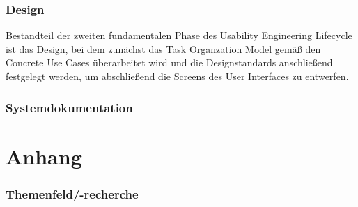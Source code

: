 \documentclass[a4paper,11pt]{article}%
\renewcommand{\\}{\vspace*{0.5\baselineskip} \newline}
\begin{document}
	\tableofcontents
	\newpage
	
	\listoftables{}
	\newpage
	
	\listoffigures{}
	\newpage
	
	
	\newpage
	
	
	\newpage
	
	
	\newpage
	
	
	\newpage
	
	
	\newpage
	
	
	\newpage
	
	
	\newpage
	
	\section{Design}
	Bestandteil der zweiten fundamentalen Phase des Usability Engineering Lifecycle ist das Design, bei dem zunächst das Task Organzation Model gemäß den Concrete Use Cases überarbeitet wird und die Designstandards anschließend festgelegt werden, um abschließend die Screens des User Interfaces zu entwerfen. 
	
	\newpage
	
	\section{Systemdokumentation}
	
	\newpage
	
	
	\newpage
	
	
	\newpage
	
	\appendix
	\vspace*{\fill}
	\part*{Anhang}
	\setcounter{section}{0}%
	\setcounter{subsection}{0}%
	\setcounter{figure}{0}
	\renewcommand{\thesection}{\Alph{section}}
	\renewcommand\thefigure{\Alph{section}\arabic{figure}}
	\vfill
	\newpage
	
	\newpage
	
	
	\section{Themenfeld/-recherche}
	\label{section:Themenfeld}
\end{document}
